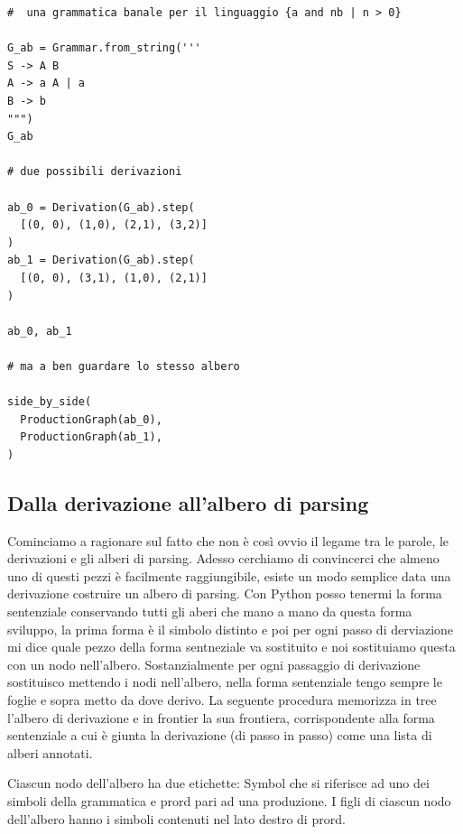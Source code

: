 \begin{lstlisting}
#  una grammatica banale per il linguaggio {a and nb | n > 0}

G_ab = Grammar.from_string('''
S -> A B
A -> a A | a
B -> b
""")
G_ab

# due possibili derivazioni

ab_0 = Derivation(G_ab).step(
  [(0, 0), (1,0), (2,1), (3,2)]
)
ab_1 = Derivation(G_ab).step(
  [(0, 0), (3,1), (1,0), (2,1)]
)

ab_0, ab_1

# ma a ben guardare lo stesso albero 

side_by_side(
  ProductionGraph(ab_0),
  ProductionGraph(ab_1),
)
\end{lstlisting}

\subsection{Dalla derivazione all'albero di parsing}
Cominciamo a ragionare sul fatto che non è così ovvio il legame tra le parole, le derivazioni e gli alberi di parsing.
Adesso cerchiamo di convincerci che almeno uno di questi pezzi è facilmente raggiungibile, esiste un modo semplice data una derivazione costruire un albero di parsing. Con Python posso tenermi la forma sentenziale conservando tutti gli aberi che mano a mano da questa forma sviluppo, la prima forma è il simbolo distinto e poi per ogni passo di derviazione mi dice quale pezzo della forma sentneziale va sostituito e noi sostituiamo questa con un nodo nell'albero.
Sostanzialmente per ogni passaggio di derivazione sostituisco mettendo i nodi nell'albero, nella forma sentenziale tengo sempre le foglie e sopra metto da dove derivo.
La seguente procedura memorizza in tree l'albero di derivazione e in frontier la sua frontiera, corrispondente alla forma sentenziale a cui è giunta la derivazione (di passo in passo) come una lista di alberi annotati.

Ciascun nodo dell'albero ha due etichette: Symbol che si riferisce ad uno dei simboli della grammatica e prord pari ad una produzione. I figli di ciascun nodo dell'albero hanno i simboli contenuti nel lato destro di prord.

